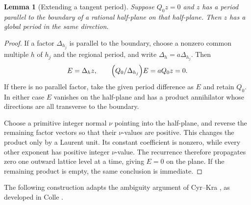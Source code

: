 \documentclass[11pt]{article}
\numberwithin{equation}{section}
\newtheorem{lemma}[theorem]{Lemma}
\theoremstyle{definition}
\theoremstyle{remark}
\newcommand{\Del}[1]{\Delta_{#1}}
\begin{document}
\begin{lemma}[Extending a tangent period]\label{lem:globalize}
Suppose $Q_0z=0$ and $z$ has a period parallel to the boundary of a rational half-plane on that
half-plane. Then $z$ has a global period in the same direction.
\end{lemma}
\begin{proof}
If a factor $\Del{h_j}$ is parallel to the boundary, choose a nonzero common multiple $h$ of $h_j$
and the regional period, and write $\Del h=a\Del{h_j}$. Then
\[
 E=\Del h z,\qquad \Bigl(Q_0/\Del{h_j}\Bigr)E=aQ_0z=0.
\]
If there is no parallel factor, take the given period difference as $E$ and retain $Q_0$. In either
case $E$ vanishes on the half-plane and has a product annihilator whose directions are all
transverse to the boundary.

Choose a primitive integer normal $\nu$ pointing into the half-plane, and reverse the remaining
factor vectors so that their $\nu$-values are positive. This changes the product only by a Laurent
unit. Its constant coefficient is nonzero, while every other exponent has positive integer
$\nu$-value. The recurrence therefore propagates zero one outward lattice level at a time, giving
$E=0$ on the plane. If the remaining product is empty, the same conclusion is immediate.
\end{proof}

The following construction adapts the ambiguity argument of Cyr--Kra \cite[Lemma~2.24]{CK},
as developed in Colle \cite[Proposition~2.13]{Colle}.
\end{document}
